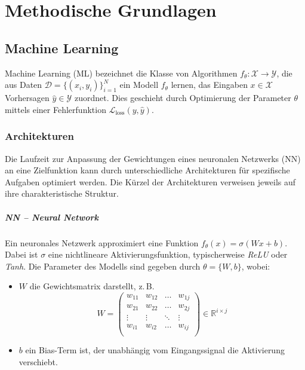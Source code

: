 
\chapter{Methodische Grundlagen}\label{chapter:methodik}

\section{Machine Learning}

Machine Learning (ML) bezeichnet die Klasse von Algorithmen \( f_{\theta} : \mathcal{X} \rightarrow \mathcal{Y} \), die aus Daten 
\( \mathcal{D} = \{ (x_i, y_i) \}_{i=1}^{N} \) ein Modell \( f_{\theta} \) lernen, das Eingaben \( x \in \mathcal{X} \) Vorhersagen \( \hat{y} \in \mathcal{Y} \) zuordnet. Dies geschieht durch Optimierung der Parameter \( \theta \) mittels einer Fehlerfunktion \( \mathcal{L}_{\text{loss}}(y, \hat{y}) \).

\subsection{Architekturen}

Die Laufzeit zur Anpassung der Gewichtungen eines neuronalen Netzwerks (NN) an eine Zielfunktion kann durch unterschiedliche Architekturen für spezifische Aufgaben optimiert werden. Die Kürzel der Architekturen verweisen jeweils auf ihre charakteristische Struktur.

\paragraph{NN – Neural Network}
Ein neuronales Netzwerk approximiert eine Funktion \( f_{\theta}(x) = \sigma(Wx + b) \). Dabei ist \( \sigma \) eine nichtlineare Aktivierungsfunktion, typischerweise \textit{ReLU} oder \textit{Tanh}. Die Parameter des Modells sind gegeben durch \( \theta = \{ W, b \} \), wobei:

\begin{itemize}
  \item \( W \) die Gewichtsmatrix darstellt, z.\,B. 
    \[
      W = 
      \begin{pmatrix}
        w_{11} & w_{12} & \dots  & w_{1j} \\
        w_{21} & w_{22} & \dots  & w_{2j} \\
        \vdots & \vdots & \ddots & \vdots \\
        w_{i1} & w_{i2} & \dots  & w_{ij} \\
      \end{pmatrix}
      \in \mathbb{R}^{i \times j}
    \]
  \item \( b \) ein Bias-Term ist, der unabhängig vom Eingangssignal die Aktivierung verschiebt.
\end{itemize}

